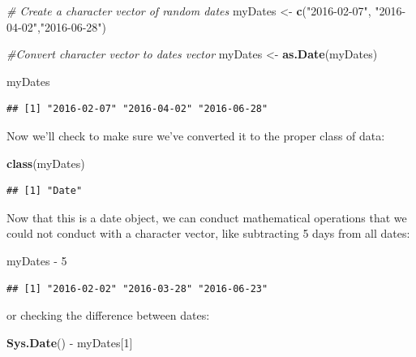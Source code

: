 \documentclass[]{book}
\newenvironment{Shaded}{\begin{snugshade}}{\end{snugshade}}
\newcommand{\KeywordTok}[1]{\textcolor[rgb]{0.13,0.29,0.53}{\textbf{{#1}}}}
\newcommand{\DecValTok}[1]{\textcolor[rgb]{0.00,0.00,0.81}{{#1}}}
\newcommand{\StringTok}[1]{\textcolor[rgb]{0.31,0.60,0.02}{{#1}}}
\newcommand{\CommentTok}[1]{\textcolor[rgb]{0.56,0.35,0.01}{\textit{{#1}}}}
\newcommand{\NormalTok}[1]{{#1}}
\begin{document}
\begin{Shaded}
\begin{Highlighting}[]
\CommentTok{# Create a character vector of random dates}
\NormalTok{myDates <-}\StringTok{ }\KeywordTok{c}\NormalTok{(}\StringTok{"2016-02-07"}\NormalTok{, }\StringTok{"2016-04-02"}\NormalTok{,}\StringTok{"2016-06-28"}\NormalTok{)}

\CommentTok{#Convert character vector to dates vector}
\NormalTok{myDates <-}\StringTok{ }\KeywordTok{as.Date}\NormalTok{(myDates)}

\NormalTok{myDates}
\end{Highlighting}
\end{Shaded}

\begin{verbatim}
## [1] "2016-02-07" "2016-04-02" "2016-06-28"
\end{verbatim}

Now we'll check to make sure we've converted it to the proper class of
data:

\begin{Shaded}
\begin{Highlighting}[]
\KeywordTok{class}\NormalTok{(myDates)}
\end{Highlighting}
\end{Shaded}

\begin{verbatim}
## [1] "Date"
\end{verbatim}

Now that this is a date object, we can conduct mathematical operations
that we could not conduct with a character vector, like subtracting 5
days from all dates:

\begin{Shaded}
\begin{Highlighting}[]
\NormalTok{myDates -}\StringTok{ }\DecValTok{5}
\end{Highlighting}
\end{Shaded}

\begin{verbatim}
## [1] "2016-02-02" "2016-03-28" "2016-06-23"
\end{verbatim}

or checking the difference between dates:

\begin{Shaded}
\begin{Highlighting}[]
\KeywordTok{Sys.Date}\NormalTok{() -}\StringTok{ }\NormalTok{myDates[}\DecValTok{1}\NormalTok{]}
\end{Highlighting}
\end{Shaded}
\end{document}
